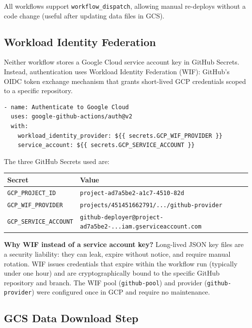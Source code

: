 All workflows support \texttt{workflow\_dispatch}, allowing manual re-deploys without a code change (useful after updating data files in GCS).

\subsection{Workload Identity Federation}

Neither workflow stores a Google Cloud service account key in GitHub Secrets. Instead, authentication uses Workload Identity Federation (WIF): GitHub's OIDC token exchange mechanism that grants short-lived GCP credentials scoped to a specific repository.

\begin{lstlisting}[style=yaml, caption={WIF authentication step}]
- name: Authenticate to Google Cloud
  uses: google-github-actions/auth@v2
  with:
    workload_identity_provider: ${{ secrets.GCP_WIF_PROVIDER }}
    service_account: ${{ secrets.GCP_SERVICE_ACCOUNT }}
\end{lstlisting}

The three GitHub Secrets used are:

\begin{center}
\begin{tabular}{ll}
\toprule
\textbf{Secret} & \textbf{Value} \\
\midrule
\texttt{GCP\_PROJECT\_ID} & \texttt{project-ad7a5be2-a1c7-4510-82d} \\
\texttt{GCP\_WIF\_PROVIDER} & \texttt{projects/451451662791/.../github-provider} \\
\texttt{GCP\_SERVICE\_ACCOUNT} & \texttt{github-deployer@project-ad7a5be2-...iam.gserviceaccount.com} \\
\bottomrule
\end{tabular}
\end{center}

\begin{decisionbox}
\textbf{Why WIF instead of a service account key?} Long-lived JSON key files are a security liability: they can leak, expire without notice, and require manual rotation. WIF issues credentials that expire within the workflow run (typically under one hour) and are cryptographically bound to the specific GitHub repository and branch. The WIF pool (\texttt{github-pool}) and provider (\texttt{github-provider}) were configured once in GCP and require no maintenance.
\end{decisionbox}

\subsection{GCS Data Download Step}

